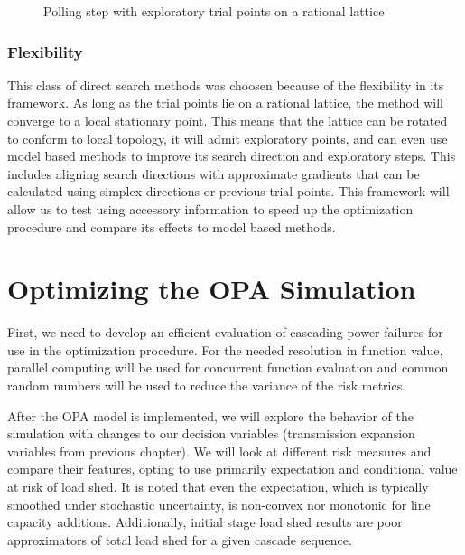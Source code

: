 \begin{figure}
\centering

\caption{Polling step with exploratory trial points on a rational lattice}\label{fig:explore}
\end{figure}




\subsubsection{Flexibility}
This class of direct search methods was choosen because of the flexibility in its framework.   As long as the trial points lie on a rational lattice, the method will converge to a local stationary point.  This means that the lattice can be rotated to conform to local topology, it will admit exploratory points, and can even use model based methods to improve its search direction and exploratory steps.  This includes aligning search directions with approximate gradients that can be calculated using simplex directions or previous trial points. This framework will allow us to test using accessory information to speed up the optimization procedure and compare its effects to model based methods.







\section{Optimizing the OPA Simulation}

First, we need to develop an efficient evaluation of cascading power failures for use in the optimization procedure.  For the needed resolution in function value, parallel computing will be used for concurrent function evaluation and common random numbers will be used to reduce the variance of the risk metrics.

After the OPA model is implemented, we will explore the behavior of the simulation with changes to our decision variables (transmission expansion variables from previous chapter).  We will look at different risk measures and compare their features, opting to use primarily expectation and conditional value at risk of load shed.  It is noted that even the expectation, which is typically smoothed under stochastic uncertainty, is non-convex nor monotonic for line capacity additions.  Additionally, initial stage load shed results are poor approximators of total load shed for a given cascade sequence.

